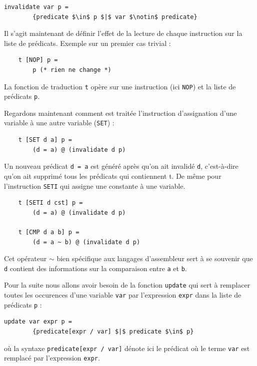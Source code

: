 \documentclass[french]{article}
\begin{document}
  \begin{lstlisting}[mathescape]
    invalidate var p =
        {predicate $\in$ p $|$ var $\notin$ predicate}
  \end{lstlisting}

  Il s'agit maintenant de définir l'effet de la lecture de chaque instruction sur la liste de prédicats.
  Exemple sur un premier cas trivial :

  \begin{lstlisting}
    t [NOP] p =
        p (* rien ne change *)
  \end{lstlisting}

  La fonction de traduction \texttt{t} opère sur une instruction (ici \texttt{NOP}) et la liste de prédicats \texttt{p}.

  Regardons maintenant comment est traitée l'instruction d'assignation d'une variable à une autre variable (\texttt{SET}) :

  \begin{lstlisting}
    t [SET d a] p =
        (d = a) @ (invalidate d p)
  \end{lstlisting}

  Un nouveau prédicat \texttt{d = a} est généré après qu'on ait invalidé \texttt{d}, c'est-à-dire qu'on ait supprimé tous les prédicats qui contiennent t.
  De même pour l'instruction \texttt{SETI} qui assigne une constante à une variable.

  \begin{lstlisting}
    t [SETI d cst] p =
        (d = a) @ (invalidate d p)

    t [CMP d a b] p =
        (d = a ~ b) @ (invalidate d p)
    \end{lstlisting}

    Cet opérateur $\sim$ bien spécifique aux langages d'assembleur sert à se souvenir que
    \texttt{d} contient des informations sur la comparaison entre \texttt{a} et \texttt{b}.

    Pour la suite nous allons avoir besoin de la fonction \texttt{update} qui sert à remplacer
    toutes les occurences d'une variable \texttt{var} par l'expression \texttt{expr} dans la liste de prédicats \texttt{p} :

  \begin{lstlisting}[mathescape]
    update var expr p =
        {predicate[expr / var] $|$ predicate $\in$ p}
  \end{lstlisting}

  où la syntaxe \texttt{predicate[expr / var]} dénote ici le prédicat où le terme \texttt{var} est remplacé par l'expression \texttt{expr}.
\end{document}
